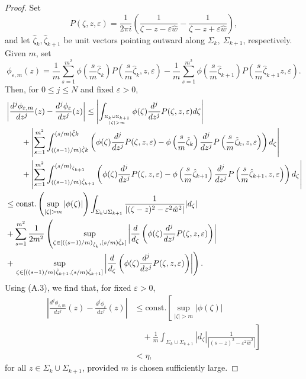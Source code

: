 \documentclass{surv-l}
\theoremstyle{plain}
\theoremstyle{definition}
\numberwithin{equation}{chapter}
\begin{document}
{\begin{proof}
Set
\begin{equation*}
P(\zeta, z,\varepsilon)=\frac{1}{2\pi i}\left(\frac{1}{\zeta-z-\varepsilon\hat{w}}-\frac{1}{\zeta-z+\varepsilon\hat{w}}\right),
\end{equation*}
and let $\hat{\zeta}_{k},\hat{\zeta}_{k+1}$ be unit vectors pointing outward along $\Sigma_{k},\ \Sigma_{k+1}$, respectively. Given $m$, set
\begin{equation*}
\phi_{\varepsilon,m}(z)=\frac{1}{m}\sum_{s=1}^{m^{2}}\phi \left(\frac{s}{m}\hat{\zeta}_{k}\right)P\left(\frac{s}{m}\hat{\zeta}_{k}, z,\varepsilon\right)-\frac{1}{m}\sum_{s=1}^{m^{2}}\phi \left(\frac{s}{m}\hat{\zeta}_{k+1}\right)P \left(\frac{s}{m}\hat{\zeta}_{k+1}z,\varepsilon\right).
\end{equation*}
Then, for $0\leq j\leq N$ and fixed $\varepsilon>0$,
\begin{align*}
& \left|\frac{d^{j}\phi_{\varepsilon,m}}{dz^{j}}(z) - \frac{d^{j}\phi_{\varepsilon}}{dz^{j}}(z)\right|\leq\left|\int_{{\Sigma_{k}\cup\Sigma_{k+1}}\atop{|\zeta|>m}}\phi(\zeta)
\frac{d^{j}}{dz^{j}}P(\zeta, z, \varepsilon)d\zeta\right|\\
& \qquad +\left|\sum_{s=1}^{m^{2}}\int_{((s-1)/m)\hat{\zeta}k}^{(s/m)\hat{\zeta}k} \left(\phi(\zeta)\frac{d^{j}}{dz^{j}}P(\zeta, z, \varepsilon)-\phi \left(\frac{s}{m}\hat{\zeta}_{k}\right)\frac{d^{j}}{dz^{j}}P \left(\frac{s}{m}\hat{\zeta}_{k},z, \varepsilon\right)\right)d_{\zeta}\right|\\
& \qquad + \left|\sum_{s=1}^{m^{2}} \int_{((s-1)/m)\hat{\zeta}_{k+1}}^{(s/m)_{\hat{\zeta}_{k+1}}}\left(\phi(\zeta)\frac{d^{j}}{dz^{j}}P(\zeta, z, \varepsilon)-\phi\left(\frac{s}{m}\hat{\zeta}_{k+1}\right)\frac{d^{j}}{dz^{j}}P\left(\frac{s}{m}\hat{\zeta}_{k+1}, z, \varepsilon\right)\right)d_{\zeta}\right| \\
& \leq \mathrm{const}. \left(\sup_{|\zeta|>m}|\phi(\zeta)|\right) \int_{\Sigma_{k}\cup\Sigma_{k+1}} \frac{1}{|(\zeta-z)^{2}-\varepsilon^{2}\hat{w}^{2}|}|d_{\zeta}|\\
&+ \sum_{s=1}^{m^{2}} \frac{1}{2m^{2}} \left(\sup_{\zeta\in[((s-1)/m)_{\hat{\zeta}_{k}},(s/m)\hat{\zeta}_{k}]} \left|\frac{d}{d_{\zeta}}\left(\phi(\zeta)\frac{d^{j}}{dz^{j}}P(\zeta, z, \varepsilon)\right)\right|\right.\\
& +\left.\sup_{\zeta\in[((s-1)/m)\hat{\zeta}_{k+1},(s/m)\hat{\zeta}_{k+1}]}\left|\frac{d}{d_{\zeta}} \left(\phi(\zeta)\frac{d^{j}}{dz^{j}}P(\zeta, z,\varepsilon)\right)\right|\right).
\end{align*}
Using (A.3), we find that, for fixed $\varepsilon >0$,
\begin{align}\label{eqA.9}
\left|\frac{d^{j}\phi_{\varepsilon,m}}{dz^{j}}(z)-\frac{d^{j}\phi_{\varepsilon}}{dz^{j}}(z)\right| & \leq \mathrm{const}. \left[\sup_{|\zeta|>m}|\phi(\zeta)|\right.\nonumber\\
&\quad+ \left. \frac{1}{m}\int_{\Sigma_{k}\cup\Sigma_{k+1}}|d_{\zeta}|\frac{1}{|(s-z)^{2}-\varepsilon^{2}\hat{w}^{2}|}\right]\\
& <\eta,\nonumber
\end{align}
for all $z\in\Sigma_{k}\cup\Sigma_{k+1}$, provided $m$ is chosen sufficiently large.


\end{proof}}
\end{document}
